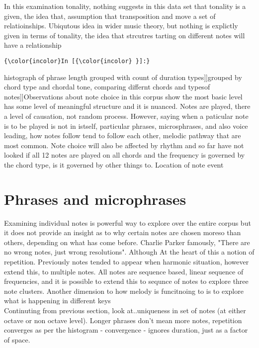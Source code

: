 \documentclass[11pt]{article}
\begin{document}
\noindent
In this examination tonality, nothing suggests in this data set that tonality is a given, the idea that, assumption that transposition and move a set of relatioinships. Ubiqutous idea in wider music theory, but nothing is explictly given in terms of tonality, the idea that strcutres tarting on different notes will have a relationship
\\
    \begin{Verbatim}[commandchars=\\\{\}]
{\color{incolor}In [{\color{incolor} }]:} 
\end{Verbatim}
\vspace{5mm} 
\noindent
histograph of phrase length grouped with count of duration types]]grouped by chord type and chordal tone, comparing differnt chords and typesof notes]]Observations about note choice in this corpus show the most basic level has some level of meaningful structure and it is nuanced. Notes are played, there a level of causation, not random process. However, saying when a paticular note is to be played is not in istself, particular phrases, microsphrases, and also voice leading, how notes follow tend to follow each other, melodic pathway that are most common. Note choice will also be affected by rhythm and so far have not looked if all 12 notes are played on all chords and the frequency is governed by the chord type, is it governed by other things to. Location of note event
\\

\section{Phrases and microphrases}

\noindent
Examining individual notes is powerful way to explore over the entire corpus but it does not provide an insight as to why certain notes are chosen moreso than others, depending on what has come before. Charlie Parker famously, "There are no wrong notes, just wrong resolutions". Although At the heart of this a notion of repetition. Previously notes tended to appear when harmonic situation, however extend this, to multiple notes. All notes are sequence based, linear sequence of frequencies, and it is possible to extend this to sequnce of notes to explore three note clusters. Another dimension to how melody is funcitnoing to is to explore what is happening in different keys
\\

\noindent
Continuting from previous section, look at..uniqueness in set of notes (at either octave or non octave level). Longer phrases don't mean more notes, repetition converges as per the histogram - convergence - ignores duration, just as a factor of space.
\\
\end{document}
